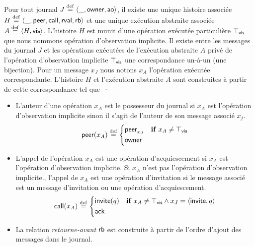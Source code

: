 \begin{definition}
Pour tout journal $J \defeq \tuple*{\_, \trm{owner}, \trm{ao}}$, il existe une unique histoire associée $H \defeq \tuple*{\_, \trm{peer}, \trm{call}, \trm{rval}, \trm{rb}}$ et une unique exécution abstraite associée $A \defeq \tuple*{H, \trm{vis}}$.
L'histoire $H$ est munit d'une opération exécutée particulière $\top_{\trm{vis}}$ que nous nommons opération d'observation implicite.
Il existe entre les messages du journal $J$ et les opérations exécutées de l'exécution abstraite $A$ privé de l'opération d'observation implicite $\top_{\trm{vis}}$ une correspondance un-à-un (une bijection).
Pour un message $x_J$ nous notons $x_A$ l'opération exécutée correspondante.
L'histoire $H$ et l'exécution abstraite $A$ sont construites à partir de cette correspondance tel que~·
\begin{itemize}
\item L'auteur d'une opération $x_A$ est le possesseur du journal si $x_A$ est l'opération d'observation implicite sinon il s'agit de l'auteur de son message associé $x_j$.
\begin{equation*}
    \trm{peer}(x_A) \defeq \begin{dcases}
        \trm{peer}_{x_J} & \when x_A \neq \top_{\trm{vis}}\\
        \trm{owner} &
    \end{dcases}
\end{equation*}
\item L'appel de l'opération $x_A$ est une opération d'acquiescement si $x_A$ est l'opération d'observation implicite.
Si $x_A$ n'est pas l'opération d'observation implicite., l'appel de $x_A$ est une opération d'invitation si le message associé est un message d'invitation ou une opération d'acquiescement.
\begin{equation*}
    \trm{call}(x_A) \defeq \begin{dcases}
        \trm{invite}(q) & \when x_A \neq \top_{\trm{vis}} \land x_J = \tuple*{\trm{invite}, q}\\
        \trm{ack} &
    \end{dcases}
\end{equation*}
\item La relation \emph{retourne-avant} $\trm{rb}$ est construite à partir de l'ordre d'ajout des messages dans le journal.

\end{itemize}
\end{definition}
